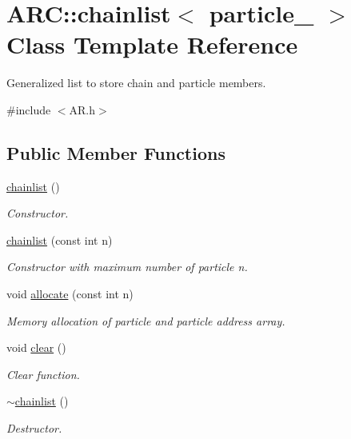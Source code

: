 \hypertarget{classARC_1_1chainlist}{}\section{A\+RC\+:\+:chainlist$<$ particle\+\_\+ $>$ Class Template Reference}
\label{classARC_1_1chainlist}


Generalized list to store chain and particle members.  




{\ttfamily \#include $<$A\+R.\+h$>$}

\subsection*{Public Member Functions}
\begin{DoxyCompactItemize}
\item 
\hyperlink{classARC_1_1chainlist_a12641a795a63d6152c22fc4b363e28c1}{chainlist} ()
\begin{DoxyCompactList}\small\item\em Constructor. \end{DoxyCompactList}\item 
\hyperlink{classARC_1_1chainlist_a5ea89068d9a738fc9619a1ff89e7bb81}{chainlist} (const int n)
\begin{DoxyCompactList}\small\item\em Constructor with maximum number of particle {\itshape n}. \end{DoxyCompactList}\item 
void \hyperlink{classARC_1_1chainlist_a5efea9e6b234b5f2d20693468398a177}{allocate} (const int n)
\begin{DoxyCompactList}\small\item\em Memory allocation of particle and particle address array. \end{DoxyCompactList}\item 
void \hyperlink{classARC_1_1chainlist_af6b33790ba054657d9e132c177ed7f04}{clear} ()
\begin{DoxyCompactList}\small\item\em Clear function. \end{DoxyCompactList}\item 
\hyperlink{classARC_1_1chainlist_ae4e636b2eb05e8e5665315e8215e2c6d}{$\sim$chainlist} ()
\begin{DoxyCompactList}\small\item\em Destructor. \end{DoxyCompactList}\item 

\end{DoxyCompactItemize}
